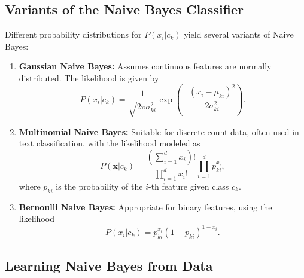 \documentclass[12pt]{article}
\begin{document}
\subsection{Variants of the Naive Bayes Classifier}
Different probability distributions for \(P(x_i|c_k)\) yield several variants of Naive Bayes:
\begin{enumerate}
    \item \textbf{Gaussian Naive Bayes:} Assumes continuous features are normally distributed. The likelihood is given by
    $$
    P(x_i|c_k) = \frac{1}{\sqrt{2\pi\sigma_{ki}^2}}\exp\left(-\frac{(x_i - \mu_{ki})^2}{2\sigma_{ki}^2}\right).
    $$
    \item \textbf{Multinomial Naive Bayes:} Suitable for discrete count data, often used in text classification, with the likelihood modeled as
    $$
    P(\bm{x}|c_k) = \frac{(\sum_{i=1}^{d} x_i)!}{\prod_{i=1}^{d} x_i!} \prod_{i=1}^{d} p_{ki}^{x_i},
    $$
    where \(p_{ki}\) is the probability of the \(i\)-th feature given class \(c_k\).
    \item \textbf{Bernoulli Naive Bayes:} Appropriate for binary features, using the likelihood
    $$
    P(x_i|c_k) = p_{ki}^{x_i} (1 - p_{ki})^{1 - x_i}.
    $$
\end{enumerate}

\subsection{Learning Naive Bayes from Data}
\end{document}
